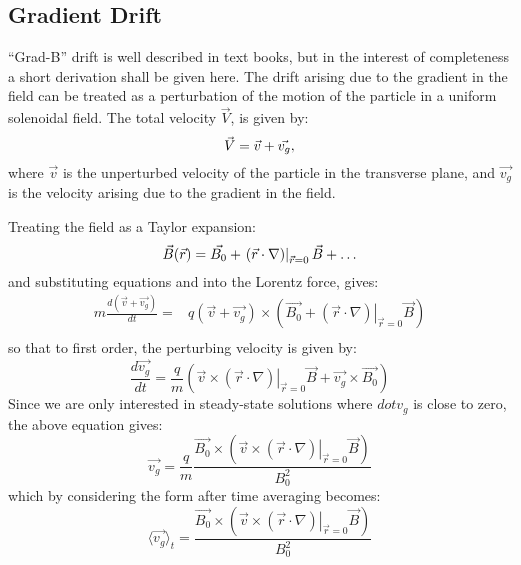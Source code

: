 \subsection{Gradient Drift}
``Grad-B'' drift is well described in text books, but in the interest of completeness a short derivation shall be given here.
The drift arising due to the gradient in the field can be treated as a perturbation of the motion of the particle in a uniform solenoidal field.
The total velocity $\vec{V}$, is given by:
\begin{equation}
\vec{V}=\vec{v}+\vec{v_g},
\eqlabel{velocity-grad}
\end{equation}
where $\vec{v}$ is the unperturbed velocity of the particle in the transverse plane, and $\vec{v_g}$ is the velocity arising due to the gradient in the field.

Treating the field as a Taylor expansion:
\begin{equation}
\vec{B}(\vec{r})=\vec{B_0}+\left.(\vec{r}\cdot\nabla)\right|_{\vec{r}=0}\vec{B}+\ldots
\eqlabel{B-field-taylor}
\end{equation}
and substituting equations  and  into the Lorentz force, gives:
\begin{align}
m\frac{d(\vec{v}+\vec{v_g})}{dt}=&q(\vec{v}+\vec{v_g})\times\left(\vec{B_0}+\left.(\vec{r}\cdot\nabla)\right|_{\vec{r}=0}\vec{B}\right) \\
\end{align}
so that to first order, the perturbing velocity is given by:
\begin{equation}
\frac{d\vec{v_g}}{dt}=\frac{q}{m}\left(\vec{v}\times\left.(\vec{r}\cdot\nabla)\right|_{\vec{r}=0}\vec{B}+\vec{v_g}\times\vec{B_0}\right)
\end{equation}
Since we are only interested in steady-state solutions where $dot{v_{g}}$ is close to zero, the above equation gives:
\begin{equation}
\vec{v_g}=\frac{q}{m}\frac{\vec{B_0}\times\left(\vec{v}\times\left.(\vec{r}\cdot\nabla)\right|_{\vec{r}=0}\vec{B}\right)}{B^2_0}
\end{equation}
which by considering the form 	after time averaging becomes:
\begin{equation}
\langle\vec{v_g}\rangle_t=\frac{\vec{B_0}\times\left(\vec{v}\times\left.(\vec{r}\cdot\nabla)\right|_{\vec{r}=0}\vec{B}\right)}{B^2_0}
\end{equation}
